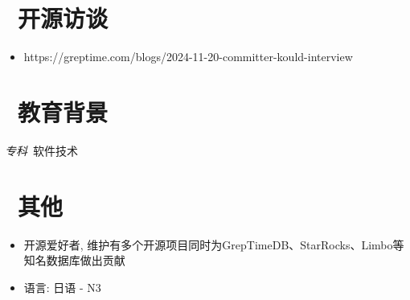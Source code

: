 \documentclass{resume}
\begin{document}
\section{\faUsers\ 开源访谈}
\begin{itemize}
  \item https://greptime.com/blogs/2024-11-20-committer-kould-interview
\end{itemize}


\section{\faGraduationCap\  教育背景}
\textit{专科}\ 软件技术

\section{\faInfo\ 其他}
\begin{itemize}[parsep=0.5ex]
  \item 开源爱好者, 维护有多个开源项目同时为GrepTimeDB、StarRocks、Limbo等知名数据库做出贡献
  \item 语言: 日语 - N3
\end{itemize}

%
%
\end{document}
